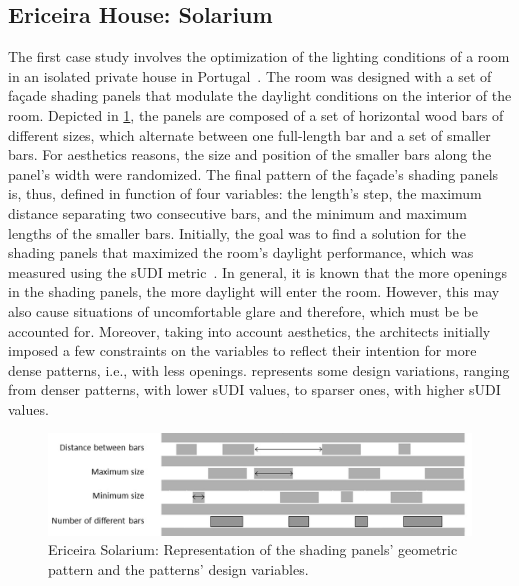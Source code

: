 \subsection{Ericeira House: Solarium}
The first case study involves the optimization of the lighting conditions of a room in an isolated private house in Portugal~\cite{Caetano2018,Belem2018optimizeddesign}. The room was designed with a set of façade shading panels that modulate the daylight conditions on the interior of the room. Depicted in \cref{fig:ericeira_panels_explanation}, the panels are composed of a set of horizontal wood bars of different sizes, which alternate between one full-length bar and a set of smaller bars. For aesthetics reasons, the size and position of the smaller bars along the panel's width were randomized. The final pattern of the façade's shading panels is, thus, defined in function of four variables: the length’s step, the maximum distance separating two consecutive bars, and the minimum and maximum lengths of the smaller bars. Initially, the goal was to find a solution for the shading panels that maximized the room's daylight performance, which was measured using the \ac{sUDI} metric~\cite{Nabil2006}. In general, it is known that the more openings in the shading panels, the more daylight will enter the room. However, this may also cause situations of uncomfortable glare and therefore, which must be be accounted for. Moreover, taking into account aesthetics, the architects initially imposed a few constraints on the variables to reflect their intention for more dense patterns, i.e., with less openings.  represents some design variations, ranging from denser patterns, with lower \ac{sUDI} values, to sparser ones, with higher \ac{sUDI} values.

\begin{figure}[htbp]
	\centering
	\includegraphics[width=\textwidth]{Images/Evaluation/Ericeira_1.jpg}
	\caption{Ericeira Solarium: Representation of the shading panels' geometric pattern and the patterns' design variables.}
	\label{fig:ericeira_panels_explanation}
\end{figure}

